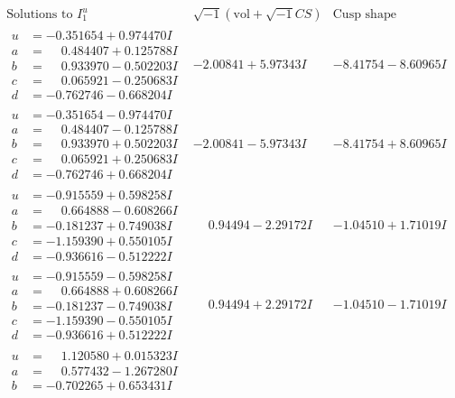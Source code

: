 \documentclass[1p]{elsarticle_modified}
\theoremstyle{definition}
\newcommand{\I}{\sqrt{-1}}
\begin{document}
$$\begin{array}{c|c|c}  
\text{Solutions to }I^u_{1}& \I (\text{vol} + \sqrt{-1}CS) & \text{Cusp shape}\\
 \hline 
\begin{aligned}
u &= -0.351654 + 0.974470 I \\
a &= \phantom{-}0.484407 + 0.125788 I \\
b &= \phantom{-}0.933970 - 0.502203 I \\
c &= \phantom{-}0.065921 - 0.250683 I \\
d &= -0.762746 - 0.668204 I\end{aligned}
 & -2.00841 + 5.97343 I & -8.41754 - 8.60965 I \\ \hline\begin{aligned}
u &= -0.351654 - 0.974470 I \\
a &= \phantom{-}0.484407 - 0.125788 I \\
b &= \phantom{-}0.933970 + 0.502203 I \\
c &= \phantom{-}0.065921 + 0.250683 I \\
d &= -0.762746 + 0.668204 I\end{aligned}
 & -2.00841 - 5.97343 I & -8.41754 + 8.60965 I \\ \hline\begin{aligned}
u &= -0.915559 + 0.598258 I \\
a &= \phantom{-}0.664888 - 0.608266 I \\
b &= -0.181237 + 0.749038 I \\
c &= -1.159390 + 0.550105 I \\
d &= -0.936616 - 0.512222 I\end{aligned}
 & \phantom{-}0.94494 - 2.29172 I & -1.04510 + 1.71019 I \\ \hline\begin{aligned}
u &= -0.915559 - 0.598258 I \\
a &= \phantom{-}0.664888 + 0.608266 I \\
b &= -0.181237 - 0.749038 I \\
c &= -1.159390 - 0.550105 I \\
d &= -0.936616 + 0.512222 I\end{aligned}
 & \phantom{-}0.94494 + 2.29172 I & -1.04510 - 1.71019 I \\ \hline\begin{aligned}
u &= \phantom{-}1.120580 + 0.015323 I \\
a &= \phantom{-}0.577432 - 1.267280 I \\
b &= -0.702265 + 0.653431 I \\

\end{aligned}
\end{array}$$
\end{document}
